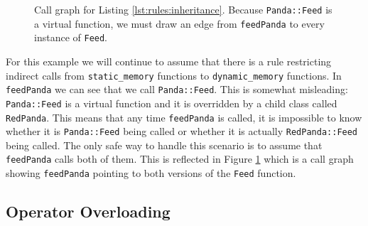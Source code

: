 \begin{figure}
    \centering
    \caption{Call graph for Listing \ref{lst:rules:inheritance}.  Because \lstinline{Panda::Feed} is a virtual function, we must draw an edge from \lstinline{feedPanda} to every instance of \lstinline{Feed}.}
    \label{fig:rules:inheritance}
\end{figure}

For this example we will continue to assume that there is a rule restricting indirect calls from \lstinline{static_memory} functions to \lstinline{dynamic_memory} functions.  In \lstinline{feedPanda} we can see that we call \lstinline{Panda::Feed}.  This is somewhat misleading:  \lstinline{Panda::Feed} is a virtual function and it is overridden by a child class called \lstinline{RedPanda}.  This means that any time \lstinline{feedPanda} is called, it is impossible to know whether it is \lstinline{Panda::Feed} being called or whether it is actually \lstinline{RedPanda::Feed} being called.  The only safe way to handle this scenario is to assume that \lstinline{feedPanda} calls both of them.  This is reflected in Figure \ref{fig:rules:inheritance} which is a call graph showing \lstinline{feedPanda} pointing to both versions of the \lstinline{Feed} function.  

\subsection{Operator Overloading}

